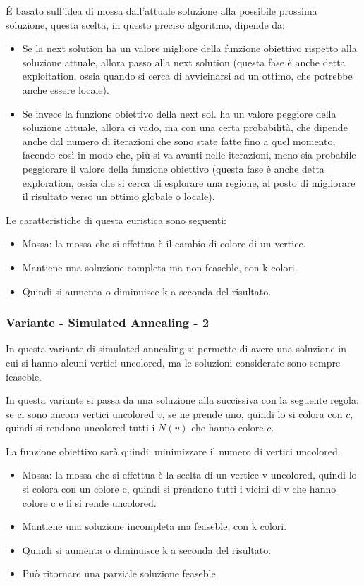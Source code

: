 \documentclass[12pt,a4paper]{article}
\begin{document}
É basato sull'idea di mossa dall'attuale soluzione alla possibile prossima soluzione, questa scelta, in questo preciso algoritmo, dipende da:

\begin{itemize}
\item Se la next solution ha un valore migliore della funzione obiettivo rispetto alla soluzione attuale, allora passo alla next solution (questa fase è anche detta exploitation, ossia quando si cerca di avvicinarsi ad un ottimo, che potrebbe anche essere locale).
\item Se invece la funzione obiettivo della next sol. ha un valore peggiore della soluzione attuale, allora ci vado, ma con una certa probabilità, che dipende anche dal numero di iterazioni che sono state fatte fino a quel momento, facendo così in modo che, più si va avanti nelle iterazioni, meno sia probabile peggiorare il valore della funzione obiettivo (questa fase è anche detta exploration, ossia che si cerca di esplorare una regione, al posto di migliorare il risultato verso un ottimo globale o locale).
\end{itemize}
Le caratteristiche di questa euristica sono seguenti:
\begin{itemize}
\item Mossa: la mossa che si effettua è il cambio di colore di un vertice.
\item Mantiene una soluzione completa ma non feaseble, con k colori.
\item Quindi si aumenta o diminuisce k a seconda del risultato.
\end{itemize}

\subsubsection{Variante - Simulated Annealing - 2}
In questa variante di simulated annealing si permette di avere una soluzione in cui si hanno alcuni vertici uncolored, ma le soluzioni considerate sono sempre feaseble.

In questa variante si passa da una soluzione alla succissiva con la seguente regola: se ci sono ancora vertici uncolored $v$, se ne prende uno, quindi lo si colora con $c$, quindi si rendono uncolored tutti i $N(v)$ che hanno colore $c$.

La funzione obiettivo sarà quindi: minimizzare il numero di vertici uncolored.

\begin{itemize}
\item Mossa: la mossa che si effettua è la scelta di un vertice v uncolored, quindi lo si colora con un colore c, quindi si prendono tutti i vicini di v che hanno colore c e li si rende uncolored.
\item Mantiene una soluzione incompleta ma feaseble, con k colori.
\item Quindi si aumenta o diminuisce k a seconda del risultato.
\item Può ritornare una parziale soluzione feaseble.
\end{itemize}
\end{document}
